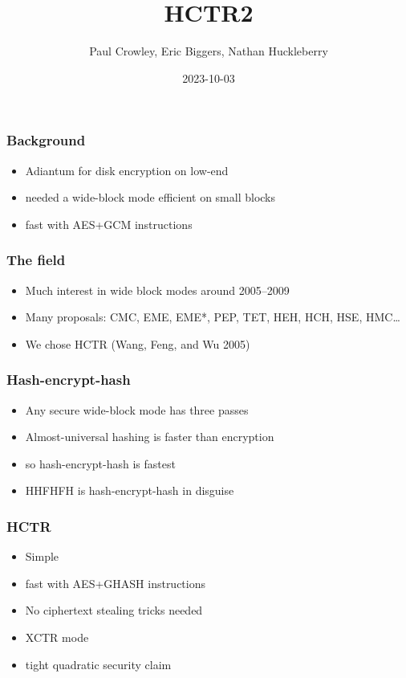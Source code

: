 \documentclass{beamer}
\title{HCTR2}
\author{Paul Crowley, Eric Biggers, Nathan Huckleberry}
\institute{Google LLC}
\date{2023-10-03}
\begin{document}
\frame{\titlepage}

\begin{frame}

\frametitle{Background}

\begin{itemize}
    \item Adiantum for disk encryption on low-end
    \item needed a wide-block mode efficient on small blocks
    \item fast with AES+GCM instructions
\end{itemize}
\end{frame}

\begin{frame}

\frametitle{The field}

\begin{itemize}
    \item Much interest in wide block modes around 2005--2009
    \item Many proposals: CMC, EME, EME*, PEP, TET, HEH, HCH, HSE, HMC\ldots
    \item We chose HCTR (Wang, Feng, and Wu 2005)
\end{itemize}
\end{frame}

\begin{frame}

\frametitle{Hash-encrypt-hash}

\begin{itemize}
    \item Any secure wide-block mode has three passes
    \item Almost-universal hashing is faster than encryption
    \item so hash-encrypt-hash is fastest
    \item HHFHFH is hash-encrypt-hash in disguise
\end{itemize}
\end{frame}

\begin{frame}

\frametitle{HCTR}

\begin{itemize}
    \item Simple
    \item fast with AES+GHASH instructions
    \item No ciphertext stealing tricks needed
    \item XCTR mode
    \item tight quadratic security claim
\end{itemize}
\end{frame}
\end{document}
